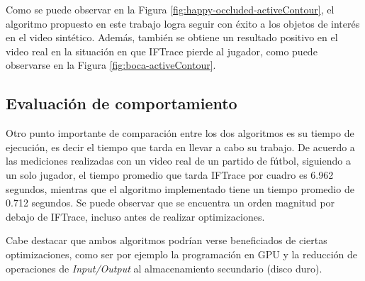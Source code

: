 Como se puede observar en la Figura \ref{fig:happy-occluded-activeContour}, el
algoritmo propuesto en este trabajo logra seguir con éxito a los objetos de
interés en el video sintético. Además, también se obtiene un resultado positivo
en el video real en la situación en que IFTrace pierde al jugador, como puede
observarse en la Figura \ref{fig:boca-activeContour}.

\subsection{Evaluación de comportamiento}

Otro punto importante de comparación entre los dos algoritmos es su tiempo de
ejecución, es decir el tiempo que tarda en llevar a cabo su trabajo.  De
acuerdo a las mediciones realizadas con un video real de un partido de fútbol,
siguiendo a un solo jugador, el tiempo promedio que tarda IFTrace por cuadro es
6.962 segundos, mientras que el algoritmo implementado tiene un tiempo promedio
de 0.712 segundos. Se puede observar que se encuentra un orden magnitud por
debajo de IFTrace, incluso antes de realizar optimizaciones.

Cabe destacar que ambos algoritmos podrían verse beneficiados de ciertas
optimizaciones, como ser por ejemplo la programación en GPU y la reducción de
operaciones de \textit{Input/Output} al almacenamiento secundario (disco duro).
